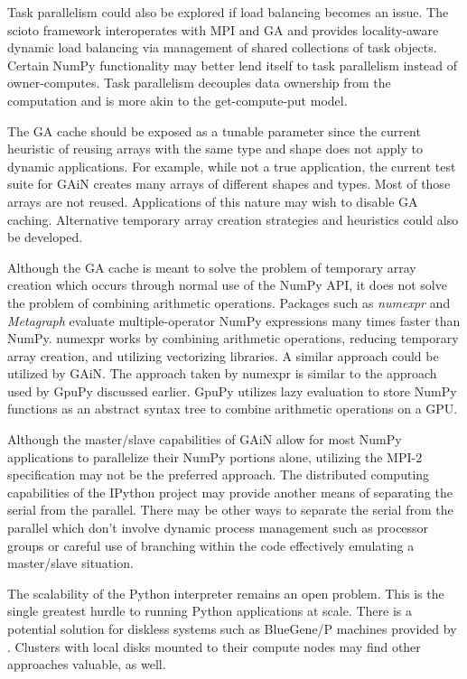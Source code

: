 \documentclass{sigplanconf}
\begin{document}
Task parallelism could also be explored if load balancing becomes an issue.
The scioto framework \cite{Din08} interoperates with MPI and GA and provides
locality-aware dynamic load balancing via management of shared collections of
task objects. Certain NumPy functionality may better lend itself to task
parallelism instead of owner-computes. Task parallelism decouples data
ownership from the computation and is more akin to the get-compute-put model.

The GA cache should be exposed as a tunable parameter since the current
heuristic of reusing arrays with the same type and shape does not apply to
dynamic applications. For example, while not a true application, the current
test suite for GAiN creates many arrays of different shapes and types. Most of
those arrays are not reused. Applications of this nature may wish to disable
GA caching.  Alternative temporary array creation strategies and heuristics
could also be developed.

Although the GA cache is meant to solve the problem of temporary array
creation which occurs through normal use of the NumPy API,  it does not solve
the problem of combining arithmetic operations. Packages such as
\emph{numexpr} \cite{Coo11} and \emph{Metagraph} \cite{Wan11} evaluate
multiple-operator NumPy expressions many times faster than NumPy. numexpr
works by combining arithmetic operations, reducing temporary array creation,
and utilizing vectorizing libraries. A similar approach could be utilized by
GAiN. The approach taken by numexpr is similar to the approach used by GpuPy
discussed earlier. GpuPy utilizes lazy evaluation to store NumPy functions as
an abstract syntax tree to combine arithmetic operations on a GPU.

Although the master/slave capabilities of GAiN allow for most NumPy
applications to parallelize their NumPy portions alone, utilizing the MPI-2
specification may not be the preferred approach. The distributed computing
capabilities of the IPython project may provide another means of separating
the serial from the parallel. There may be other ways to separate the serial
from the parallel which don't involve dynamic process management such as
processor groups or careful use of branching within the code effectively
emulating a master/slave situation.

The scalability of the Python interpreter remains an open problem. This is the
single greatest hurdle to running Python applications at scale. There is a
potential solution for diskless systems such as BlueGene/P machines provided
by \cite{Scu11}. Clusters with local disks mounted to their compute nodes may
find other approaches valuable, as well.
\end{document}
